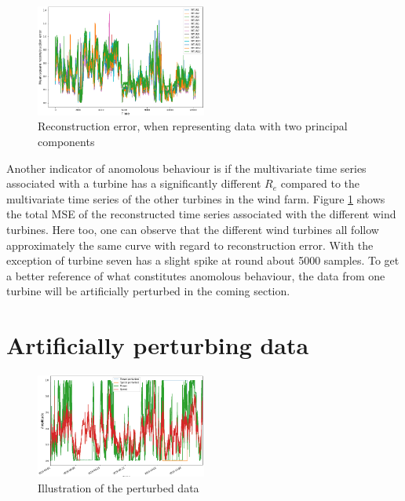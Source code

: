\begin{figure}[h]
    \begin{center}
    \includegraphics[width=0.5\textwidth]{data_exp/reconstruction_error}
    \end{center}
    \caption{Reconstruction error, when representing data with two principal components} 
    \label{fig:recon_error}
\end{figure}

Another indicator of anomolous behaviour is if the multivariate time series associated with a turbine has a significantly different $R_e$ compared to the multivariate time series of the other turbines in the wind farm. 
Figure \ref{fig:recon_error} shows the total MSE of the reconstructed time series associated with the different wind turbines. 
Here too, one can observe that the different wind turbines all follow approximately the same curve with regard to reconstruction error. 
With the exception of turbine seven has a slight spike at round about 5000 samples. 
To get a better reference of what constitutes anomolous behaviour, the data from one turbine will be artificially perturbed in the coming section. 

\section{Artificially perturbing data}

\begin{figure}
    \begin{center}
    \includegraphics[width=0.5\textwidth]{data_exp/perturbed_vs_unperturbed}
    \end{center}
    \caption{Illustration of the perturbed data} 
    \label{fig:illu_perturbed_data}
\end{figure}

